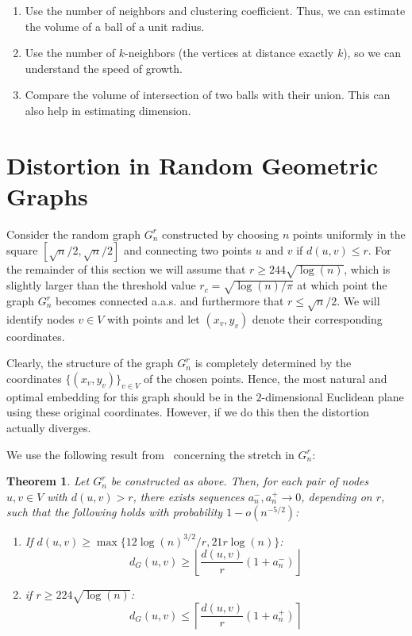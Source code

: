 \documentclass{article}
\newtheorem{theorem}{Theorem}[section]
\begin{document}
\begin{enumerate}
    \item Use the number of neighbors and clustering coefficient. Thus, we can estimate the volume of a ball of a unit radius. 
    \item Use the number of $k$-neighbors (the vertices at distance exactly $k$), so we can understand the speed of growth.
    \item Compare the volume of intersection of two balls with their union. This can also help in estimating dimension.
\end{enumerate}
            
\section{Distortion in Random Geometric Graphs}

Consider the random graph $G_n^r$ constructed by choosing $n$ points uniformly in the square $[\sqrt{n}/2, \sqrt{n}/2]$ and connecting two points $u$ and $v$ if $d(u,v) \le r$. For the remainder of this section we will assume that $r \ge 244 \sqrt{\log(n)}$, which is slightly larger than the threshold value $r_c = \sqrt{\log(n)/\pi}$ at which point the graph $G_n^r$ becomes connected a.a.s. and furthermore that $r \le \sqrt{n}/2$. We will identify nodes $v \in V$ with points and let $(x_v,y_v)$ denote their corresponding coordinates.

Clearly, the structure of the graph $G_n^r$ is completely determined by the coordinates $\{(x_v,y_v)\}_{v \in V}$ of the chosen points. Hence, the most natural and optimal embedding for this graph should be in the $2$-dimensional Euclidean plane using these original coordinates. However, if we do this then the distortion actually diverges.

We use the following result from~\cite{diaz2016relation} concerning the stretch in $G_n^r$:

\begin{theorem}\label{thm:stretch_rgg}
Let $G_n^r$ be constructed as above. Then, for each pair of nodes $u,v \in V$ with $d(u, v) > r$, there exists sequences $a_n^-, a_n^+ \to 0$, depending on $r$, such that the following holds with probability $1 - o(n^{-5/2})$:
\begin{enumerate}
\item If $d(u,v) \ge \max\{12\log(n)^{3/2}/r, 21 r \log(n)\}$:
\[
	d_G(u,v) \ge \left\lfloor \frac{d(u,v)}{r}\left(1 + a_n^-\right)\right\rfloor
\]
\item if $r \ge 224 \sqrt{\log(n)}$:
\[
	d_G(u,v) \le \left\lceil \frac{d(u,v)}{r}\left(1 + a_n^+\right)\right\rceil
\]
\end{enumerate}
\end{theorem}
\end{document}
